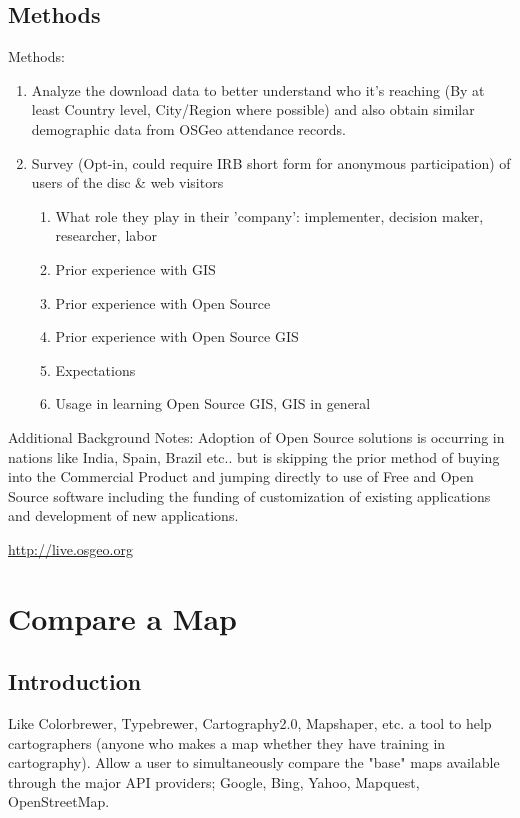 \documentclass[12pt,letterpaper]{article}
\begin{document}
\subsection{Methods}
Methods:
\begin{enumerate}
\item Analyze the download data to better understand who it's reaching (By at least Country level, City/Region where possible) and also obtain similar demographic data from OSGeo attendance records.
\item Survey (Opt-in, could require IRB short form for anonymous participation) of users of the disc \& web visitors
	\begin{enumerate}
		\item What role they play in their 'company': implementer, decision maker, researcher, labor
		\item Prior experience with GIS
		\item Prior experience with Open Source
		\item Prior experience with Open Source GIS
		\item Expectations
		\item Usage in learning Open Source GIS, GIS in general
	\end{enumerate}
\end{enumerate}

Additional Background Notes: Adoption of Open Source solutions is occurring in nations like India, Spain, Brazil etc.. but is skipping the prior method of buying into the Commercial Product and jumping directly to use of Free and Open Source software including the funding of customization of existing applications and development of new applications.

\url{http://live.osgeo.org}

\section{Compare a Map}
\subsection{Introduction}
Like Colorbrewer, Typebrewer, Cartography2.0, Mapshaper, etc. a tool to help cartographers (anyone who makes a map whether they have training in cartography). Allow a user to simultaneously compare the "base" maps available through the major API providers; Google, Bing, Yahoo, Mapquest, OpenStreetMap.
\end{document}
